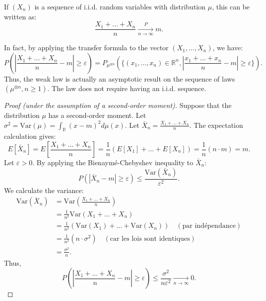 \begin{remark}
If $(X_n)$ is a sequence of i.i.d. random variables with distribution $\mu$, this can be written as:
\[
\frac{X_1 + \dots + X_n}{n} \xrightarrow[n\to\infty]{P} m.
\]
\end{remark}
\begin{remark}
In fact, by applying the transfer formula to the vector $(X_1, \dots, X_n)$, we have:
\[
P\left(\left|\frac{X_1+\dots+X_n}{n} - m\right| \ge \varepsilon\right) = P_{\mu^{\otimes n}}\left(\{(x_1, \dots, x_n) \in \mathbb{R}^n, \left|\frac{x_1+\dots+x_n}{n} - m\right| \ge \varepsilon\}\right).
\]
Thus, the weak law is actually an asymptotic result on the sequence of laws $(\mu^{\otimes n}, n \ge 1)$. The law does not require having an i.i.d. sequence.
\end{remark}%
\begin{proof}[Proof (under the assumption of a second-order moment)]
Suppose that the distribution $\mu$ has a second-order moment. Let $\sigma^2 = \text{Var}(\mu) = \int_{\mathbb{R}} (x-m)^2 d\mu(x)$.
Let $\bar{X}_n = \frac{X_1 + \dots + X_n}{n}$.
The expectation calculation gives:
\[
E[\bar{X}_n] = E\left[\frac{X_1 + \dots + X_n}{n}\right] = \frac{1}{n}(E[X_1] + \dots + E[X_n]) = \frac{1}{n}(n \cdot m) = m.
\]
Let $\varepsilon > 0$. By applying the Bienaymé-Chebyshev inequality to $\bar{X}_n$:
\[
P(|\bar{X}_n - m| \ge \varepsilon) \le \frac{\text{Var}(\bar{X}_n)}{\varepsilon^2}.
\]
We calculate the variance:
\begin{align*}
\text{Var}(\bar{X}_n) &= \text{Var}\left(\frac{X_1 + \dots + X_n}{n}\right) \\
&= \frac{1}{n^2} \text{Var}(X_1 + \dots + X_n) \\
&= \frac{1}{n^2} (\text{Var}(X_1) + \dots + \text{Var}(X_n)) \quad (\text{par indépendance}) \\
&= \frac{1}{n^2} (n \cdot \sigma^2) \quad (\text{car les lois sont identiques}) \\
&= \frac{\sigma^2}{n}.
\end{align*}
Thus,
\[
P\left(\left|\frac{X_1 + \dots + X_n}{n} - m\right| \ge \varepsilon\right) \le \frac{\sigma^2}{n\varepsilon^2} \xrightarrow[n\to\infty]{} 0.
\]
\end{proof}%
